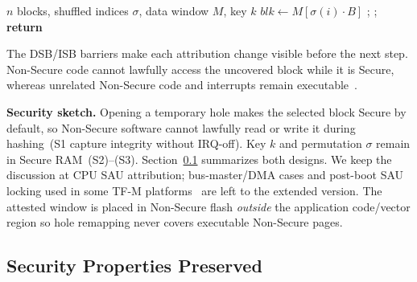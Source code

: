 \documentclass[conference]{IEEEtran}
\begin{document}
\begin{algorithm}[!ht]
\caption{SAU Hole-Remapping Secure Service}
\label{alg:sau}
\begin{algorithmic}[1]
\Require $n$ blocks, shuffled indices $\sigma$, data window $M$, key $k$
\State {}
\State {} 
  \State $\mathit{blk} \gets M[\sigma(i)\cdot B]$
  \State {} 
  \State {};  
  \State {} 
  \State {} 
  \State {}; 
\EndFor
\State \textbf{return} 
\end{algorithmic}
\end{algorithm}

The DSB/ISB barriers make each attribution change visible before the
next step. Non-Secure code cannot lawfully access the uncovered block
while it is Secure, whereas unrelated Non-Secure code and interrupts
remain executable~\cite{armv8m-arm}.

\textbf{Security sketch.} Opening a temporary  hole makes the selected
block Secure by default, so Non-Secure software cannot lawfully read or
write it during hashing~(S1 capture integrity without IRQ-off). Key $k$
and permutation $\sigma$ remain in Secure RAM~(S2)--(S3).
Section~\ref{sec:security_summary} summarizes both designs.
We keep the discussion at CPU SAU attribution; bus-master/DMA cases and
post-boot SAU locking used in some TF-M
platforms~\cite{tfm-isolation,tfm2024} are left to the extended version.
The attested window is placed in Non-Secure flash \emph{outside} the
application code/vector region so hole remapping never covers executable
Non-Secure pages.

\subsection{Security Properties Preserved}
\label{sec:security_summary}
\end{document}
